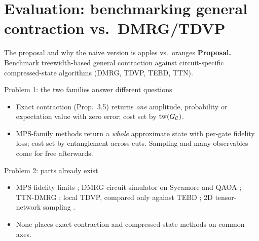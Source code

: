 \section{Evaluation: benchmarking general contraction vs.\ DMRG/TDVP}

\begin{frame}{The proposal and why the naive version is apples vs.\ oranges}
    \textbf{Proposal.} Benchmark treewidth-based general contraction against circuit-specific compressed-state algorithms (DMRG, TDVP, TEBD, TTN).
    \begin{block}{Problem 1: the two families answer different questions}
        \begin{itemize}
            \item Exact contraction (Prop.~3.5) returns \emph{one} amplitude, probability or expectation value with zero error; cost set by $\operatorname{tw}(G_{\mathcal{C}})$.
            \item MPS-family methods return a \emph{whole} approximate state with per-gate fidelity loss; cost set by entanglement across cuts. Sampling and many observables come for free afterwards.
        \end{itemize}
    \end{block}
    \begin{block}{Problem 2: parts already exist}
        \begin{itemize}
            \item MPS fidelity limits \parencite{zhou2020limits}; DMRG circuit simulator on Sycamore and QAOA \parencite{ayral2023dmrg}; TTN-DMRG \parencite{ttndmrg2025}; local TDVP, compared only against TEBD \parencite{localtdvp2025}; 2D tensor-network sampling \parencite{rudolph2025sampling}.
            \item None places exact contraction and compressed-state methods on common axes.
        \end{itemize}
    \end{block}
\end{frame}

